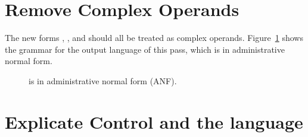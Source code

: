 \documentclass[11pt]{book}
\newcommand{\gray}[1]{{\color{gray} #1}}
\begin{document}
\section{Remove Complex Operands}
\label{sec:remove-complex-opera-Rvec}

The new forms , , and 
should all be treated as complex operands.
Figure~\ref{fig:Rvec-anf-syntax}
shows the grammar for the output language \LangVecANF{} of this
pass, which is \LangVec{} in administrative normal form.

\begin{figure}[tp]
\centering
\fbox{
\begin{minipage}{0.96\textwidth}
\small
\[
\begin{array}{rcl}
  \Atm &::=& \gray{ \INT{\Int} \mid \VAR{\Var} \mid \BOOL{\itm{bool}} }
       \mid \VOID{} \\
\Exp &::=& \gray{ \Atm \mid \READ{} } \\
   &\mid& \gray{ \NEG{\Atm} \mid \ADD{\Atm}{\Atm} } \\
   &\mid& \gray{ \LET{\Var}{\Exp}{\Exp} } \\
   &\mid& \gray{ \UNIOP{\key{'not}}{\Atm} } \\
   &\mid& \gray{ \BINOP{\itm{cmp}}{\Atm}{\Atm} \mid \IF{\Exp}{\Exp}{\Exp} }\\
   &\mid& \LP\key{Collect}~\Int\RP \mid \LP\key{Allocate}~\Int~\Type\RP
   \mid \LP\key{GlobalValue}~\Var\RP\\
R^{\dagger}_3  &::=& \gray{ \PROGRAM{\code{'()}}{\Exp} }
\end{array}
\]
\end{minipage}
}
\caption{\LangVecANF{} is \LangVec{} in administrative normal form (ANF).}
\label{fig:Rvec-anf-syntax}
\end{figure}


\section{Explicate Control and the \LangCVec{} language}
\label{sec:explicate-control-r3}
\end{document}
